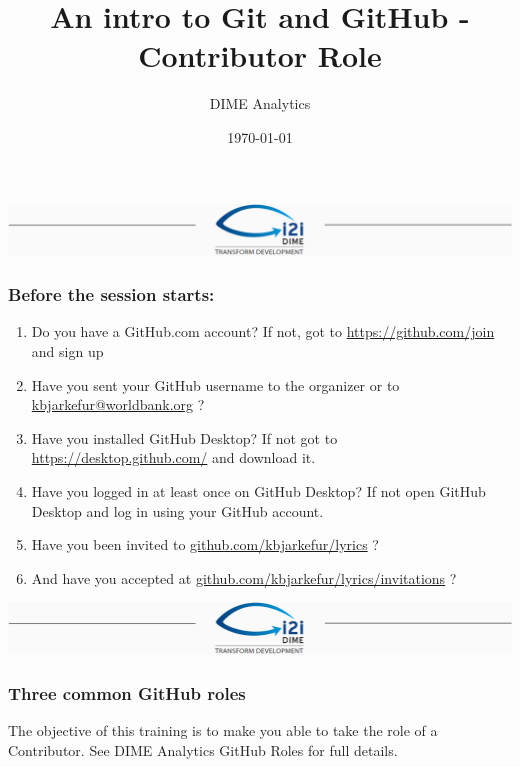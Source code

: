 \documentclass[aspectratio=169]{beamer} %
\title{An intro to Git and GitHub - Contributor Role}
\author{DIME Analytics}
\institute{DIME - The World Bank - \trainingURL{https://www.worldbank.org/en/research/dime}}
\date{\today}
\makeatletter
\newcommand{\trainingURL}[1]{{\color{blue}\url{#1}}}
\newcommand{\traininerUsername}{kbjarkefur}
\newcommand{\repoName}{\traininerUsername/lyrics}
\newcommand{\trainingRepoURL}[1]{\trainingURL{github.com/\repoName #1}}
\newcommand{\trainerEmail}{\trainingURL{kbjarkefur@worldbank.org} }
\makeatother
\begin{document}
\begin{frame}
\includegraphics[width=\textwidth]{../../Common-Resources/img/Header.png}
\vspace{-0.2cm}
\titlepage 	 %
\end{frame}

\begin{frame}
\frametitle{Before the session starts:}
	\begin{enumerate}
		\item Do you have a GitHub.com account? If not, got to \trainingURL{https://github.com/join} and sign up
		\item Have you sent your GitHub username to the organizer or to \trainerEmail?
		\item Have you installed GitHub Desktop? If not got to \trainingURL{https://desktop.github.com/} and download it.
		\item Have you logged in at least once on GitHub Desktop? If not open GitHub Desktop and log in using your GitHub account.
		\item Have you been invited to \trainingRepoURL{} ?
		\item And have you accepted at \trainingRepoURL{/invitations} ?
	\end{enumerate}

\end{frame}

\begin{frame}
\includegraphics[width=\textwidth]{../../Common-Resources/img/Header.png}
\vspace{-0.2cm}
\titlepage 	 %
\end{frame}

\begin{frame}
	\frametitle{Three common GitHub roles}

	\small The objective of this training is to make you able to take the role of a Contributor. See DIME Analytics GitHub Roles for full details.

	

\end{frame}
\end{document}
